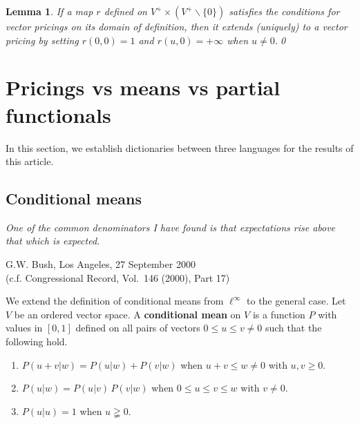 \documentclass[10pt,a4paper]{amsart}
\newtheorem{lem}{Lemma}
\begin{document}
\begin{lem}\label{lem:no-0}
If a map $r$ defined on $V^+ \times ( V^+ \smallsetminus \{0\})$ satisfies the conditions for vector pricings on its domain of definition, then it extends (uniquely) to a vector pricing by setting $r(0,0)=1$ and $r(u, 0)=+\infty$ when $u\neq 0$.\qed
\end{lem}

\section{Pricings vs means vs partial functionals}\label{sec:PPP}%
In this section, we establish dictionaries between three languages for the results of this article.
\subsection{Conditional means}\label{sec:CM}%
\begin{flushright}
\begin{minipage}[t]{0.85\linewidth}\itshape
One of the common denominators I have found is that expectations rise above that which is expected.
\end{minipage}
\end{flushright}
\begin{flushright}
\begin{minipage}[t]{0.75\linewidth}\small
G.W. Bush, Los Angeles, 27 September 2000\\
(c.f. Congressional Record, Vol.~146 (2000), Part 17)
\end{minipage}
\end{flushright}
% 
We extend the definition of conditional means from $\ell^\infty$ to the general case. Let $V$ be an ordered vector space. A \textbf{conditional mean} on $V$ is a function $P$ with values in $[0,1]$ defined on all pairs of vectors $0\leq u\leq v \neq 0$ such that the following hold.%
\begin{enumerate}[left=2\parindent, labelsep=\parindent, topsep=3pt, itemsep=3pt, label=\normalfont(CM\arabic*)]
\item $P(u+v | w) = P(u| w)+P(v | w)$ when $u+v\leq w\neq 0$ with $u,v\geq 0$. \label{pt:CM:add}
\item $P(u|w) = P(u|v)\, P(v|w)$ when $0\leq u \leq v \leq w$ with $v\neq 0$.\label{pt:CM:trans}
\item $P(u|u)=1$ when $u\gneqq 0$.\label{pt:CM:one}
\end{enumerate}
\end{document}
